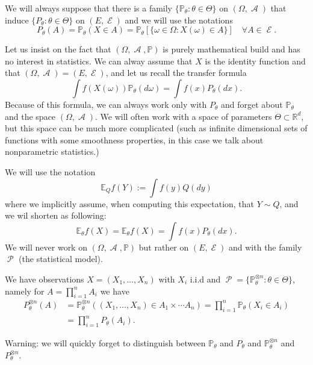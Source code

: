 \documentclass[
	fontsize=11pt, %
	twoside=false, %
	numbers=noenddot, %
]{kaobook}
\DeclareMathOperator{\cA}{\mathcal A}
\DeclareMathOperator{\cE}{\mathcal E}
\DeclareMathOperator{\cP}{\mathcal P}
\renewcommand{\P}{\mathbb P}
\newcommand{\E}{\mathbb E}
\newcommand{\R}{\mathbb R}
\begin{document}
We will always suppose that there is a family $\{ \P_\theta : \theta \in \Theta\}$ on $(\Omega, \cA)$ that induce $\{ P_\theta : \theta \in \Theta\}$ on $(E, \cE)$ and we will use the notations
\begin{equation*}
	P_\theta(A) = \P_\theta(X \in A) = \P_\theta[ \{ \omega \in \Omega : X(\omega) \in A \}] \quad \forall A \in \cE.
\end{equation*}

Let us insist on the fact that $(\Omega, \cA, \P)$ is  purely mathematical build and has no interest in statistics.
We can alway assume that $X$ is the identity function and that $(\Omega, \cA) = (E, \cE)$, and let us recall the transfer formula
\begin{equation*}
	\int f(X(\omega)) \P_\theta(d \omega) = \int f(x) P_\theta(dx).
\end{equation*}
Because of this formula, we can always work only with $P_\theta$ and forget about $\P_\theta$ and the space $(\Omega, \cA)$.
We will often work with a space of parameters $\Theta \subset \R^d$, but this space can be much more complicated (such as infinite dimensional sets of functions with some smoothness properties, in this case we talk about nonparametric statistics.)

We will use the notation
\begin{equation*}
	\E_Q f(Y) := \int f(y) Q(dy)
\end{equation*}
where we implicitly assume, when computing this expectation, that $Y \sim Q$, and we wil shorten as following:
\begin{equation*}
	\E_\theta f(X) = \E_\theta f(X) = \int f(x) P_\theta(dx).
\end{equation*}
We will never work on $(\Omega, \cA, \P)$ but rather on $(E, \cE)$ and with the family $\cP$ (the statistical model).
\begin{definition}
We have observations $X = (X_1, \ldots, X_n)$ with $X_i$ i.i.d and $\cP = \{ \P_\theta^{\otimes n} : \theta \in \Theta\}$, namely for $A = \prod_{i=1}^n A_i$ we have
\begin{align*}
	P_\theta^{\otimes n}(A) &= \P_\theta^{\otimes n}( (X_1, \ldots, X_n) \in A_1 \times \cdots A_n) = \prod_{i=1}^n \P_\theta(X_i \in A_i) \\
	&= \prod_{i=1}^n P_\theta(A_i).
\end{align*}
\end{definition}

Warning: we will quickly forget to distinguish between $\P_\theta$ and $P_\theta$ and $\P_\theta^{\otimes n}$ and $P_\theta^{\otimes n}$. 
\end{document}
